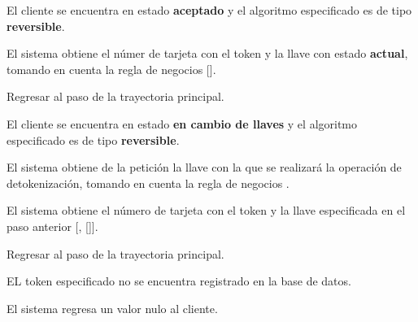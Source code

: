 {\begin{trayectoriaAlternativa}
  \end{trayectoriaAlternativa}

  \begin{trayectoriaAlternativa}
    {El cliente se encuentra en estado \textbf{aceptado} y el algoritmo
    especificado es de tipo \textbf{reversible}.}

    \item El sistema obtiene el númer de tarjeta con el token y la llave
      con estado \textbf{actual}, tomando en cuenta la regla de negocios
      [].

    \item Regresar al paso  de la trayectoria
      principal.

  \end{trayectoriaAlternativa}

  \begin{trayectoriaAlternativa}
    {El cliente se encuentra en estado \textbf{en cambio de llaves} y el
    algoritmo especificado es de tipo \textbf{reversible}.}

    \item El sistema obtiene de la petición la llave con la que se realizará
      la operación de detokenización, tomando en cuenta la regla de negocios
      .

    \item El sistema obtiene el número de tarjeta con el token y la llave
      especificada en el paso anterior
      [,
      []].

    \item Regresar al paso  de la trayectoria
      principal.

  \end{trayectoriaAlternativa}

  \begin{trayectoriaAlternativa}
    {EL token especificado no se encuentra registrado en la base de datos.}

    \item El sistema regresa un valor nulo al cliente.

  \end{trayectoriaAlternativa}

}
